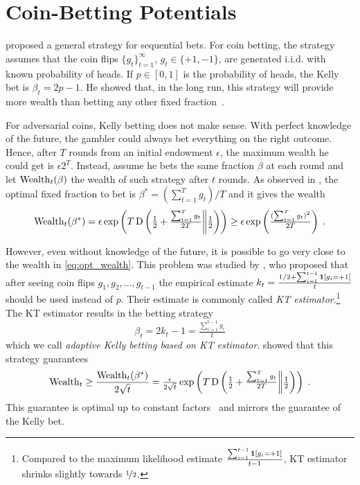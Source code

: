 \section{Coin-Betting Potentials}
\label{section:coin-betting-potentials}

\citet{Kelly-1956} proposed a general strategy for sequential bets. For coin
betting, the strategy assumes that the coin flips $\{g_t\}_{t=1}^\infty$, $g_t
\in \{+1,-1\}$, are generated i.i.d. with known probability of heads. If $p \in
[0,1]$ is the probability of heads, the Kelly bet is $\beta_t = 2p - 1$. He
showed that, in the long run, this strategy will provide more wealth than
betting any other fixed fraction~\cite{Kelly-1956}.

For adversarial coins, Kelly betting does not make sense. With perfect knowledge
of the future, the gambler could always bet everything on the right outcome.
Hence, after $T$ rounds from an initial endowment $\epsilon$, the maximum
wealth he could get is $\epsilon 2^T$.  Instead, assume he bets the same
fraction $\beta$ at each round and let $\operatorname{Wealth}_t(\beta)$ the wealth of such strategy
after $t$ rounds. As observed in
\cite{McMahan-Abernethy-2013}, the optimal fixed fraction to bet is
$\beta^*=(\sum_{t=1}^T g_t)/T$ and it gives the wealth
\begin{equation}
\label{eq:opt_wealth}
\operatorname{Wealth}_t(\beta^*)
= \epsilon \exp\left(T \operatorname{D}\left({\tfrac{1}{2}+\tfrac{\sum_{t=1}^T g_t}{2T}}\middle\|{\tfrac{1}{2}}\right)\right)
\geq \epsilon \exp\left(\tfrac{(\sum_{t=1}^T g_t)^2}{2 T}\right) \; .
\end{equation}

However, even without knowledge of the future, it is possible to go very close to the wealth in \eqref{eq:opt_wealth}.
This problem was studied by \citet{Krichevsky-Trofimov-1981},
who proposed that after seeing coin flips $g_1, g_2, \dots, g_{t-1}$ the
empirical estimate $k_t = \frac{1/2 + \sum_{i=1}^{t-1} \mathbf{1}[g_i = +1]}{t}$
should be used instead of $p$. Their estimate is commonly called \emph{KT
estimator}.\footnote{Compared to the maximum likelihood estimate
$\frac{\sum_{i=1}^{t-1} \mathbf{1}[g_i = +1]}{t-1}$, KT estimator shrinks
slightly towards $\nicefrac{1}{2}$.} The KT estimator results in the betting strategy
\begin{equation}
\label{equation:kt-estimator-betting-strategy}
\beta_t = 2k_t - 1 = \tfrac{\sum_{i=1}^{t-1} g_i}{t}
\end{equation}
which we call \emph{adaptive Kelly betting based on KT estimator}.
\citeauthor{Krichevsky-Trofimov-1981} showed that this strategy guarantees
\[
\operatorname{Wealth}_t \ge \frac{\operatorname{Wealth}_t(\beta^*)}{2\sqrt{t}}
= \tfrac{\epsilon}{2\sqrt{t}} \exp\left(T \operatorname{D}\left({\tfrac{1}{2}+\tfrac{\sum_{t=1}^T g_t}{2T}}\middle\|{\tfrac{1}{2}}\right)\right)\; .
\]
This guarantee is optimal up to constant factors~\citep{Cesa-Bianchi-Lugosi-2006} and mirrors the guarantee of
the Kelly bet.


